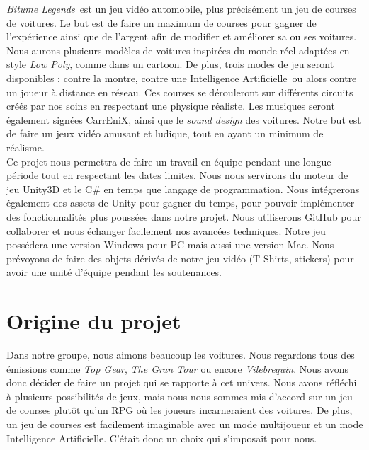 \documentclass[12pt,a4paper]{article}
\newcommand{\btmlgs}{\textit{Bitume Legends}}
\newcommand{\AI}{Intelligence Artificielle}
\newcommand{\CEX}{CarrEniX}
\begin{document}
\btmlgs\, est un jeu vidéo automobile, plus précisément un jeu de courses de voitures. Le but est 
de faire un maximum de courses pour gagner de l'expérience ainsi que de l'argent afin de
modifier et améliorer sa ou ses voitures.
Nous aurons plusieurs modèles de voitures inspirées du monde réel adaptées en style \textit{Low Poly},
comme dans un cartoon. De plus, trois modes de jeu seront disponibles : contre la montre, contre une \AI\,
ou alors contre un joueur à distance en réseau. Ces courses se dérouleront sur différents circuits créés 
par nos soins en respectant une physique réaliste.
Les musiques seront également signées \CEX, ainsi que le \textit{sound design} des voitures.
Notre but est de faire un jeux vidéo amusant et ludique, tout en ayant un minimum de réalisme.\\

Ce projet nous permettra de faire un travail en équipe pendant une longue période tout en respectant les dates limites.
Nous nous servirons du moteur de jeu Unity3D et le C\# en temps que langage de programmation. Nous intégrerons 
également des assets de Unity pour gagner du temps, pour pouvoir implémenter des fonctionnalités plus poussées dans notre projet.
Nous utiliserons GitHub pour collaborer et nous échanger facilement nos avancées techniques.
Notre jeu possédera une version Windows pour PC mais aussi une version Mac.
Nous prévoyons de faire des objets dérivés de notre jeu vidéo (T-Shirts, stickers) pour avoir une unité d'équipe 
pendant les soutenances.\\


\clearpage

\section{Origine du projet}
Dans notre groupe, nous aimons beaucoup les voitures. Nous regardons tous des émissions comme 
\textit{Top Gear}, \textit{The Gran Tour} ou encore \textit{Vilebrequin}. Nous avons donc décider de faire
un projet qui se rapporte à cet univers. Nous avons réfléchi à plusieurs possibilités de jeux, mais nous
nous sommes mis d'accord sur un jeu de courses plutôt qu'un RPG où les joueurs incarneraient des voitures.
De plus, un jeu de courses est facilement imaginable avec un mode multijoueur et un mode Intelligence 
Artificielle. C'était donc un choix qui s'imposait pour nous.\\
\end{document}
